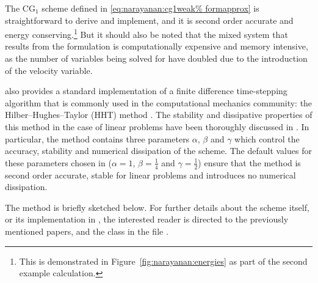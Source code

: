 The CG$_{1}$ scheme defined in \eqref{eq:narayanan:cg1weak%
formapprox} is straightforward to derive and implement, and it is
second order accurate and energy conserving.\footnote{This is
  demonstrated in Figure~\ref{fig:narayanan:energies} as part of the
  second example calculation.}  But it should also be noted that the mixed
system that results from the formulation is computationally expensive
and memory intensive, as the number of variables being solved for have
doubled due to the introduction of the velocity variable.

\twist{} also provides a standard implementation of a finite
difference time-stepping algorithm that is commonly used in the
computational mechanics community: the Hilber--Hughes--Taylor (HHT)
method \citep{HilberHughesTaylor1977}. The stability and dissipative
properties of this method in the case of linear problems have been
thoroughly discussed in \citet{Hughes1987}. In particular, the method
contains three parameters $\alpha$, $\beta$ and $\gamma$ which control
the accuracy, stability and numerical\vadjust{\pagebreak} dissipation of the scheme. The
default values for these parameters chosen in \twist{} ($\alpha = 1$,
$\beta = \frac{1}{4}$ and $\gamma = \frac{1}{2}$) ensure that the
method is second order accurate, stable for linear problems and
introduces no numerical dissipation.

The method is briefly sketched below. For further details about the scheme
itself, or its implementation in \twist, the interested reader is directed
to the previously mentioned papers, and the 
class in the file .

